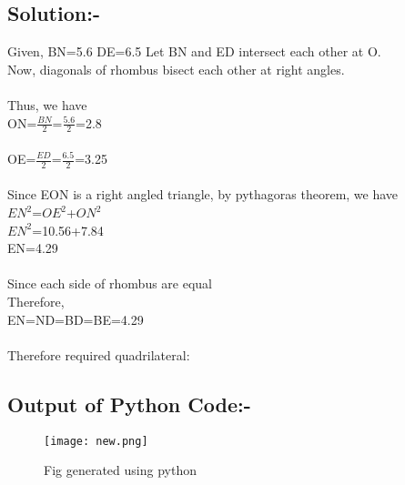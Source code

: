 \documentclass[a4paper,12pt]{article}
\begin{document}
\subsection{Solution:-}
Given, BN=5.6 DE=6.5
Let BN and ED intersect each other at O.\\
Now, diagonals of rhombus bisect each other at right angles.\\\\
Thus, we have\\
ON=$\frac{BN}{2}$=$\frac{5.6}{2}$=2.8\\\\
OE=$\frac{ED}{2}$=$\frac{6.5}{2}$=3.25\\\\
Since EON is a right angled triangle, by pythagoras theorem, we have\\
$EN^2$=$OE^2$+$ON^2$\\
$EN^2$=10.56+7.84\\
EN=4.29\\\\
Since each side of rhombus are equal\\
Therefore, \\
EN=ND=BD=BE=4.29\\\\
	Therefore required quadrilateral:
\begin{center}
\end{center}
\subsection{Output of Python Code:-}
\begin{figure}[htp]
	\centering
	\texttt{[image: new.png]}
	\caption{Fig generated using python}
\end{figure}
\end{document}
